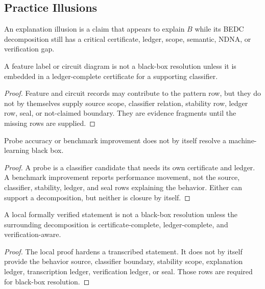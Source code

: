\subsection{Practice Illusions}
\label{subsec:philosophy-decomposition-practice-illusions}

\begin{definition}
\label{def:philosophy-explanation-illusion}
An explanation illusion is a claim that appears to explain $B$ while its
BEDC decomposition still has a critical certificate, ledger, scope,
semantic, NDNA, or verification gap.
\end{definition}

\begin{theorem}
\label{thm:philosophy-feature-circuit-records-not-decompositions}
A feature label or circuit diagram is not a black-box resolution unless
it is embedded in a ledger-complete certificate for a supporting
classifier.
\end{theorem}
\begin{proof}
Feature and circuit records may contribute to the pattern row, but they
do not by themselves supply source scope, classifier relation, stability
row, ledger row, seal, or not-claimed boundary. They are evidence
fragments until the missing rows are supplied.
\end{proof}

\begin{theorem}
\label{thm:philosophy-probe-benchmark-gains-not-decompositions}
Probe accuracy or benchmark improvement does not by itself resolve a
machine-learning black box.
\end{theorem}
\begin{proof}
A probe is a classifier candidate that needs its own certificate and
ledger. A benchmark improvement reports performance movement, not the
source, classifier, stability, ledger, and seal rows explaining the
behavior. Either can support a decomposition, but neither is closure by
itself.
\end{proof}

\begin{theorem}
\label{thm:philosophy-local-proof-not-black-box-resolution}
A local formally verified statement is not a black-box resolution unless
the surrounding decomposition is certificate-complete, ledger-complete,
and verification-aware.
\end{theorem}
\begin{proof}
The local proof hardens a transcribed statement. It does not by itself
provide the behavior source, classifier boundary, stability scope,
explanation ledger, transcription ledger, verification ledger, or seal.
Those rows are required for black-box resolution.
\end{proof}

